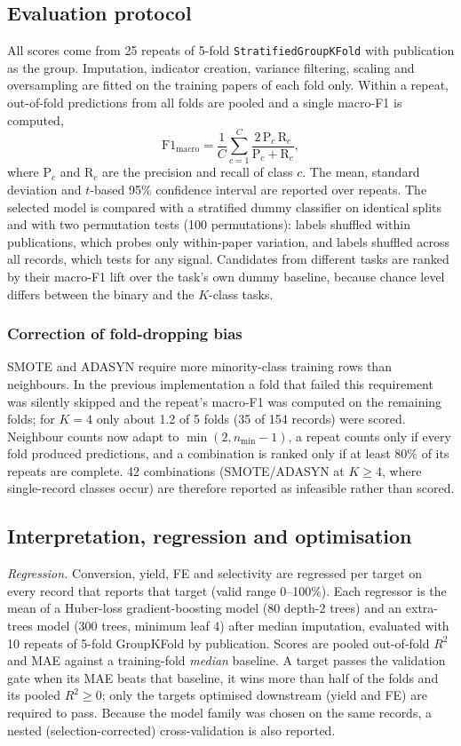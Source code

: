 \documentclass[11pt,a4paper]{article}
\begin{document}
\subsection{Evaluation protocol}\label{sec:eval}
All scores come from 25 repeats of 5-fold \texttt{StratifiedGroupKFold} with publication as the
group. Imputation, indicator creation, variance filtering, scaling and oversampling are fitted on
the training papers of each fold only. Within a repeat, out-of-fold predictions from all folds are
pooled and a single macro-F1 is computed,
\begin{equation}
\mathrm{F1}_{\text{macro}} = \frac{1}{C}\sum_{c=1}^{C}\frac{2\,\mathrm{P}_c\,\mathrm{R}_c}{\mathrm{P}_c+\mathrm{R}_c},
\end{equation}
where $\mathrm{P}_c$ and $\mathrm{R}_c$ are the precision and recall of class $c$. The mean, standard
deviation and $t$-based 95\% confidence interval are reported over repeats. The selected model is
compared with a stratified dummy classifier on identical splits and with two permutation tests
(100 permutations): labels shuffled within publications, which probes only within-paper
variation, and labels shuffled across all records, which tests for any signal. Candidates from
different tasks are ranked by their macro-F1 lift over the task's own dummy baseline, because
chance level differs between the binary and the $K$-class tasks.

\subsubsection*{Correction of fold-dropping bias}\label{sec:eval-fix}
SMOTE and ADASYN require more minority-class training rows than neighbours. In the previous
implementation a fold that failed this requirement was silently skipped and the repeat's macro-F1
was computed on the remaining folds; for $K=4$ only about 1.2 of 5 folds (35 of 154 records) were
scored. Neighbour counts now adapt to $\min(2, n_{\min}-1)$, a repeat counts only if every fold
produced predictions, and a combination is ranked only if at least 80\% of its repeats are
complete. 42 combinations (SMOTE/ADASYN at $K\geq 4$, where single-record classes occur) are therefore reported as infeasible rather than scored.
\subsection{Interpretation, regression and optimisation}
\textit{Regression.} Conversion, yield, FE and selectivity are regressed per target on every
record that reports that target (valid range 0--100\%). Each regressor is the mean of a Huber-loss
gradient-boosting model (80 depth-2 trees) and an extra-trees model (300 trees, minimum leaf 4)
after median imputation, evaluated with 10 repeats of 5-fold GroupKFold by publication. Scores
are pooled out-of-fold $R^2$ and MAE against a training-fold \emph{median} baseline. A target
passes the validation gate when its MAE beats that baseline, it wins more than half of the
folds and its pooled $R^2\geq0$; only the targets optimised downstream (yield and FE) are
required to pass. Because the model family was chosen on the same records, a nested
(selection-corrected) cross-validation is also reported.
\end{document}
